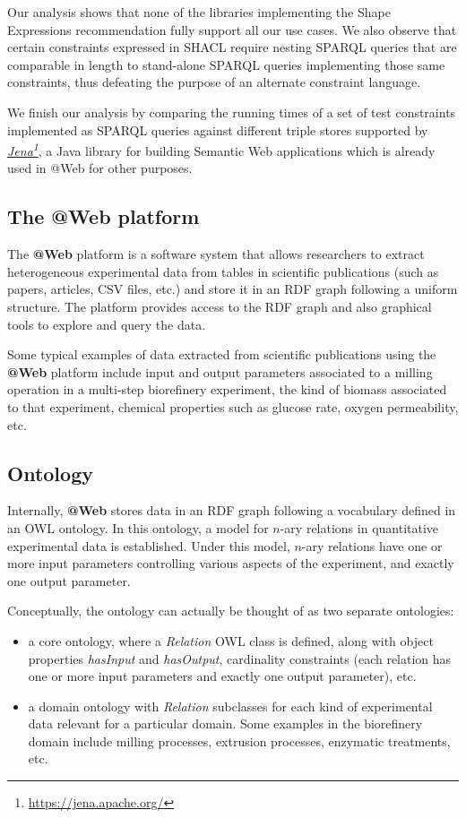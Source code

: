 \documentclass[a4paper, 10pt]{article}
\makeatletter
\newcommand{\atweb}{\textbf{@Web}\xspace}
\newcommand{\nary}{$n$-ary\xspace}
\newcommand{\fnhref}[2]{\href{#2}{#1}\footnote{\url{#2}}}
\newcommand{\ifnhref}[2]{\textit{\fnhref{#1}{#2}}}
\makeatother
\begin{document}
Our analysis shows that none of the libraries implementing the Shape
Expressions recommendation fully support all our use cases. We also observe
that certain constraints expressed in SHACL require nesting SPARQL queries that
are comparable in length to stand-alone SPARQL queries implementing those same
constraints, thus defeating the purpose of an alternate constraint language.

We finish our analysis by comparing the running times of a set of test
constraints implemented as SPARQL queries against different triple stores
supported by \ifnhref{Jena}{https://jena.apache.org/}, a Java library for
building Semantic Web applications which is already used in @Web for other
purposes.


\subsection{The \atweb platform}

The \atweb platform is a software system that allows researchers to extract
heterogeneous experimental data from tables in scientific publications (such as
papers, articles, CSV files, etc.) and store it in an RDF graph following a
uniform structure. The platform provides access to the RDF graph and also
graphical tools to explore and query the data.

Some typical examples of data extracted from scientific publications using the
\atweb platform include input and output parameters associated to a milling
operation in a multi-step biorefinery experiment, the kind of biomass
associated to that experiment, chemical properties such as glucose rate, oxygen
permeability, etc.


\subsection{Ontology}
\label{sec:ontology}

Internally, \atweb stores data in an RDF graph following a vocabulary defined
in an OWL ontology. In this ontology, a model for \nary relations in
quantitative experimental data is established. Under this model, \nary
relations have one or more input parameters controlling various aspects of the
experiment, and exactly one output parameter.

Conceptually, the ontology can actually be thought of as two separate
ontologies:

\begin{itemize}
  \item a core ontology, where a \textit{Relation} OWL class is defined, along
    with object properties \textit{hasInput} and \textit{hasOutput},
    cardinality constraints (each relation has one or more input parameters and
    exactly one output parameter), etc.

  \item a domain ontology with \textit{Relation} subclasses for each kind of
    experimental data relevant for a particular domain. Some examples in the
    biorefinery domain include milling processes, extrusion processes,
    enzymatic treatments, etc.
\end{itemize}
\end{document}
